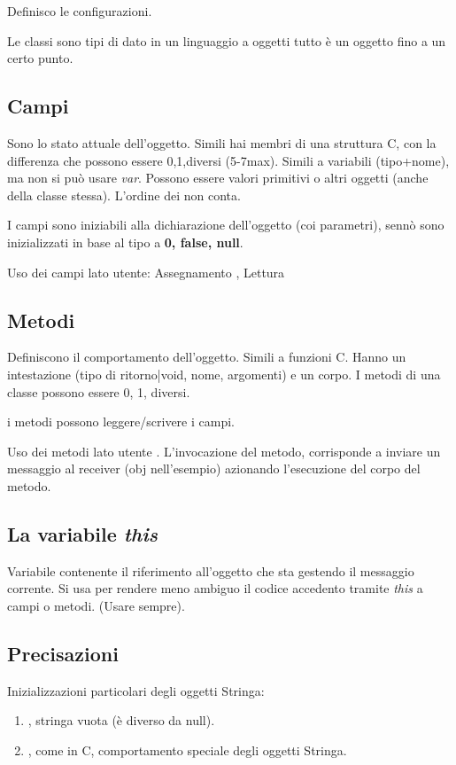
Definisco le configurazioni.

Le classi sono tipi di dato in un linguaggio a oggetti tutto è un oggetto fino a un certo punto.

\subsection{Campi}
Sono lo stato attuale dell'oggetto.
Simili hai membri di una struttura C, con la differenza che possono essere 0,1,diversi (5-7max). Simili a variabili (tipo+nome), ma non si può usare \textit{var}.
Possono essere valori primitivi o altri oggetti (anche della classe stessa).
L'ordine dei non conta.

I campi sono iniziabili alla dichiarazione dell'oggetto (coi parametri), sennò sono inizializzati in base al tipo a \textbf{0, false, null}.

Uso dei campi lato utente: Assegnamento , Lettura 

\subsection{Metodi}
Definiscono il comportamento dell'oggetto.
Simili a funzioni C. Hanno un intestazione (tipo di ritorno|void, nome, argomenti) e un corpo.
I metodi di una classe possono essere 0, 1, diversi.

i metodi possono leggere/scrivere i campi.

Uso dei metodi lato utente . L'invocazione del metodo, corrisponde a inviare un messaggio al receiver (obj nell'esempio) azionando l'esecuzione del corpo del metodo.


\subsection{La variabile \textit{this}}
Variabile contenente il riferimento all'oggetto che sta gestendo il messaggio corrente. Si usa per rendere meno ambiguo il codice accedento tramite \textit{this} a campi o metodi. (Usare sempre).

\subsection{Precisazioni}
Inizializzazioni particolari degli oggetti Stringa:
\begin{enumerate}
	\item {}, stringa vuota (è diverso da null).
	\item {}, come in C, comportamento speciale degli oggetti Stringa.
\end{enumerate}
